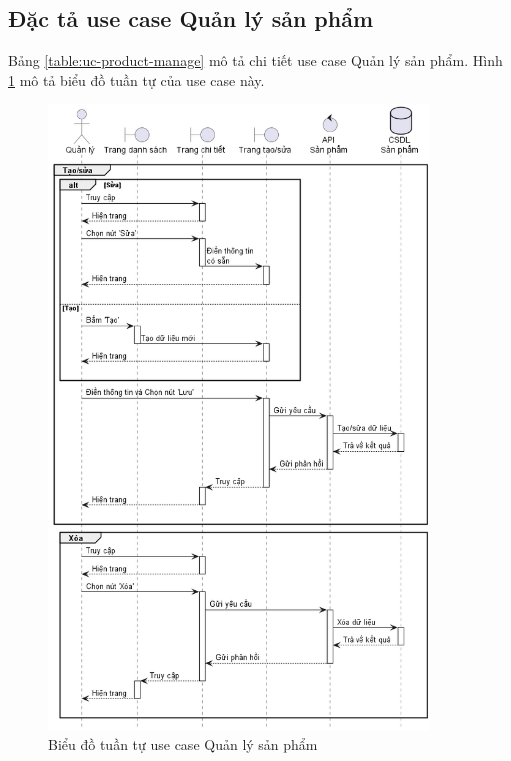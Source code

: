 \documentclass[../DoAn.tex]{subfiles}
\begin{document}
\subsection{Đặc tả use case Quản lý sản phẩm}
\label{section:uc-product-manage}
Bảng \ref{table:uc-product-manage} mô tả chi tiết use case Quản lý sản phẩm. Hình \ref{figure:sd-product-manage} mô tả biểu đồ tuần tự của use case này.
\begin{figure}[H]
    \centering
    \includegraphics[width=0.9\textwidth]{Hinhve/sequences/ProductManage.png}
    \caption{Biểu đồ tuần tự use case Quản lý sản phẩm}
    \label{figure:sd-product-manage}
\end{figure}
\end{document}
